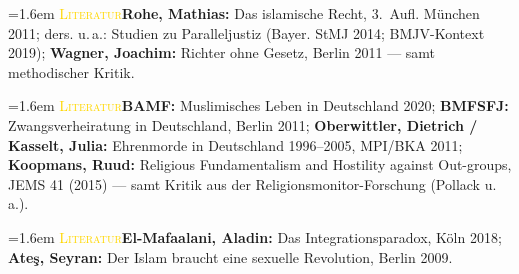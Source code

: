 \documentclass[11pt,a4paper,ngerman]{scrartcl}
\newcommand{\litentry}[2]{\par\noindent\hangindent=1.6em\hangafter=1
  {\footnotesize\scshape\textcolor{gold}{#1}}\quad #2\par\smallskip}
\begin{document}
\litentry{Literatur}{\textbf{Rohe, Mathias:} Das islamische Recht, 3.~Aufl. München 2011; ders. u.\,a.: Studien zu Paralleljustiz (Bayer. StMJ 2014; BMJV-Kontext 2019); \textbf{Wagner, Joachim:} Richter ohne Gesetz, Berlin 2011 --- samt methodischer Kritik.}
\litentry{Literatur}{\textbf{BAMF:} Muslimisches Leben in Deutschland 2020; \textbf{BMFSFJ:} Zwangsverheiratung in Deutschland, Berlin 2011; \textbf{Oberwittler, Dietrich / Kasselt, Julia:} Ehrenmorde in Deutschland 1996--2005, MPI/BKA 2011; \textbf{Koopmans, Ruud:} Religious Fundamentalism and Hostility against Out-groups, JEMS 41 (2015) --- samt Kritik aus der Religionsmonitor-Forschung (Pollack u.\,a.).}
\litentry{Literatur}{\textbf{El-Mafaalani, Aladin:} Das Integrationsparadox, Köln 2018; \textbf{Ateş, Seyran:} Der Islam braucht eine sexuelle Revolution, Berlin 2009.}

\medskip
{}
\end{document}

